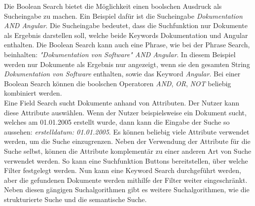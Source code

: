 Die Boolean Search bietet die Möglichkeit einen boolschen Ausdruck als Sucheingabe zu machen.
Ein Beispiel dafür ist die Sucheingabe \textit{Dokumentation AND Angular}.
Die Sucheingabe bedeutet, dass die Suchfunktion nur Dokumente als Ergebnis darstellen soll, welche beide Keywords Dokumentation und Angular enthalten.
Die Boolean Search kann auch eine Phrase, wie bei der Phrase Search, beinhalten: \textit{"Dokumentation von Software" AND Angular}.
In diesem Beispiel werden nur Dokumente als Ergebnis nur angezeigt, wenn sie den gesamten String \textit{Dokumentation von Software} enthalten, sowie das Keyword \textit{Angular}.
Bei einer Boolean Search können die boolschen Operatoren \textit{AND}, \textit{OR}, \textit{NOT} beliebig kombiniert werden.\\

Eine Field Search sucht Dokumente anhand von Attributen.
Der Nutzer kann diese Attribute auswählen.
Wenn der Nutzer beispielsweise ein Dokument sucht, welches am 01.01.2005 erstellt wurde, dann kann die Eingabe der Suche so aussehen: \textit{erstelldatum: 01.01.2005}.
Es können beliebig viele Attribute verwendet werden, um die Suche einzugrenzen.
Neben der Verwendung der Attribute für die Suche selbst, können die Attribute komplementär zu einer anderen Art von Suche verwendet werden.
So kann eine Suchfunktion Buttons bereitstellen, über welche Filter festgelegt werden.
Nun kann eine Keyword Search durchgeführt werden, aber die gefundenen Dokumente werden mithilfe der Filter weiter eingeschränkt.
Neben diesen gängigen Suchalgorithmen gibt es weitere Suchalgorithmen, wie die strukturierte Suche und die semantische Suche.